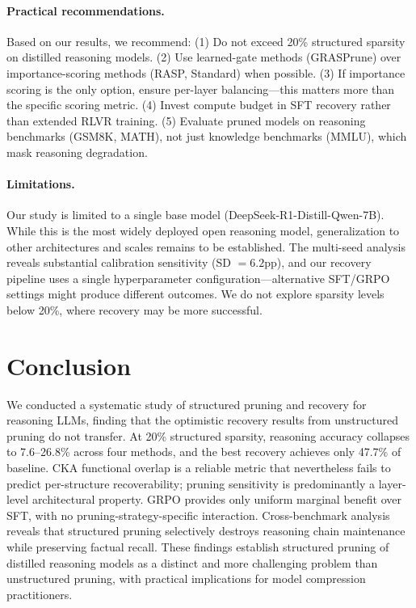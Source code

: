 \documentclass[11pt,a4paper]{article}
\begin{document}
\paragraph{Practical recommendations.}
Based on our results, we recommend:
(1) Do not exceed 20\% structured sparsity on distilled reasoning models.
(2) Use learned-gate methods (GRASPrune) over importance-scoring methods (RASP, Standard) when possible.
(3) If importance scoring is the only option, ensure per-layer balancing---this matters more than the specific scoring metric.
(4) Invest compute budget in SFT recovery rather than extended RLVR training.
(5) Evaluate pruned models on reasoning benchmarks (GSM8K, MATH), not just knowledge benchmarks (MMLU), which mask reasoning degradation.

\paragraph{Limitations.}
Our study is limited to a single base model (DeepSeek-R1-Distill-Qwen-7B).
While this is the most widely deployed open reasoning model, generalization to other architectures and scales remains to be established.
The multi-seed analysis reveals substantial calibration sensitivity (SD $= 6.2$pp), and our recovery pipeline uses a single hyperparameter configuration---alternative SFT/GRPO settings might produce different outcomes.
We do not explore sparsity levels below 20\%, where recovery may be more successful.

\section{Conclusion}
\label{sec:conclusion}

We conducted a systematic study of structured pruning and recovery for reasoning LLMs, finding that the optimistic recovery results from unstructured pruning do not transfer.
At 20\% structured sparsity, reasoning accuracy collapses to 7.6--26.8\% across four methods, and the best recovery achieves only 47.7\% of baseline.
CKA functional overlap is a reliable metric that nevertheless fails to predict per-structure recoverability; pruning sensitivity is predominantly a layer-level architectural property.
GRPO provides only uniform marginal benefit over SFT, with no pruning-strategy-specific interaction.
Cross-benchmark analysis reveals that structured pruning selectively destroys reasoning chain maintenance while preserving factual recall.
These findings establish structured pruning of distilled reasoning models as a distinct and more challenging problem than unstructured pruning, with practical implications for model compression practitioners.
\end{document}
